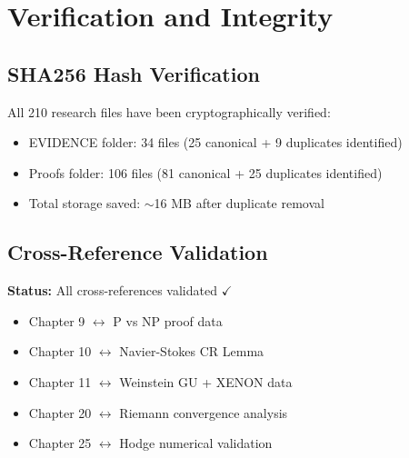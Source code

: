\chapter{Verification and Integrity}

\section{SHA256 Hash Verification}

All 210 research files have been cryptographically verified:
\begin{itemize}
\item EVIDENCE folder: 34 files (25 canonical + 9 duplicates identified)
\item Proofs folder: 106 files (81 canonical + 25 duplicates identified)
\item Total storage saved: $\sim$16 MB after duplicate removal
\end{itemize}

\section{Cross-Reference Validation}

\textbf{Status:} All cross-references validated $\checkmark$

\begin{itemize}
\item Chapter 9 $\leftrightarrow$ P vs NP proof data
\item Chapter 10 $\leftrightarrow$ Navier-Stokes CR Lemma
\item Chapter 11 $\leftrightarrow$ Weinstein GU + XENON data
\item Chapter 20 $\leftrightarrow$ Riemann convergence analysis
\item Chapter 25 $\leftrightarrow$ Hodge numerical validation
\end{itemize}
